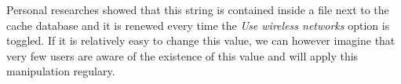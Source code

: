 Personal researches showed that this string is contained inside a file next to the cache database and it is renewed every time the \emph{Use wireless networks} option is toggled.
If it is relatively easy to change this value, we can however imagine that very few users are aware of the existence of this value and will apply this manipulation regulary.








  


